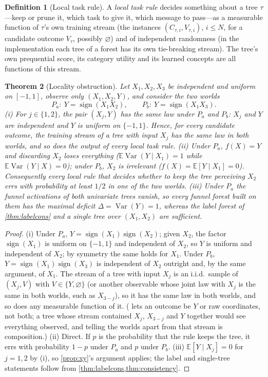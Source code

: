 \documentclass[11pt]{article}
\newtheorem{theorem}{Theorem}
\theoremstyle{definition}
\newtheorem{definition}[theorem]{Definition}
\theoremstyle{remark}
\newcommand{\E}{\mathbb{E}}
\newcommand{\Var}{\operatorname{Var}}
\begin{document}
\begin{definition}[Local task rule]\label{def:local}
A \emph{local task rule} decides something about a tree $\tau$---keep or prune it,
which task to give it, which message to pass---as a measurable function of $\tau$'s own
training stream (the instances $(C_{\tau,i},V_{\tau,i})$, $i\le N$, for a candidate
outcome $V_\tau$, possibly $\varnothing$) and of independent randomness (in the
implementation each tree of a forest has its own tie-breaking stream).  The tree's own
prequential score, its category utility and its learned concepts are all functions of
this stream.
\end{definition}

\begin{theorem}[Locality obstruction]\label{thm:locality}
Let $X_1,X_2,X_3$ be independent and uniform on $[-1,1]$, observe only $(X_1,X_2,Y)$,
and consider the two worlds
\[
  P_a:\ Y=\operatorname{sign}(X_1X_2),\qquad P_b:\ Y=\operatorname{sign}(X_1X_3).
\]
(i) For $j\in\{1,2\}$, the pair $(X_j,Y)$ has the same law under $P_a$ and $P_b$: $X_j$
and $Y$ are independent and $Y$ is uniform on $\{-1,1\}$.  Hence, for every candidate
outcome, the training stream of a tree with input $X_j$ has the same law in both worlds,
and so does the output of every local task rule.  (ii) Under $P_a$, $f(X)=Y$ and
discarding $X_2$ loses everything ($\E\Var(Y\mid X_1)=1$ while $\E\Var(Y\mid X)=0$);
under $P_b$, $X_2$ is irrelevant ($f(X)=\E[Y\mid X_1]=0$).  Consequently every local
rule that decides whether to keep the tree perceiving $X_2$ errs with probability at
least $1/2$ in one of the two worlds.  (iii) Under $P_a$ the funnel activations of both
univariate trees vanish, so every funnel forest built on them has the maximal deficit
$\Delta=\Var(Y)=1$, whereas the label forest of \cref{thm:labelcons} and a single tree
over $(X_1,X_2)$ are sufficient.
\end{theorem}
\begin{proof}
(i) Under $P_a$, $Y=\operatorname{sign}(X_1)\operatorname{sign}(X_2)$; given $X_2$, the
factor $\operatorname{sign}(X_1)$ is uniform on $\{-1,1\}$ and independent of $X_2$, so
$Y$ is uniform and independent of $X_2$; by symmetry the same holds for $X_1$.  Under
$P_b$, $Y=\operatorname{sign}(X_1)\operatorname{sign}(X_3)$ is independent of $X_2$
outright and, by the same argument, of $X_1$.  The stream of a tree with input $X_j$ is an
i.i.d.\ sample of $(X_j,V)$ with $V\in\{Y,\varnothing\}$ (or another observable whose
joint law with $X_j$ is the same in both worlds, such as $X_{3-j}$), so it has the same
law in both worlds, and so does any measurable function of it.  ( lets an
outcome be $Y$ or raw coordinates, not both; a tree whose stream contained $X_j$, $X_{3-j}$
and $Y$ together would see everything observed, and telling the worlds apart from that
stream is composition.)  (ii) Direct.  If $p$ is
the probability that the rule keeps the tree, it errs with probability $1-p$ under
$P_a$ and $p$ under $P_b$.  (iii) $\E[Y\mid X_j]=0$ for $j=1,2$ by (i), so
\cref{prop:xy}'s argument applies; the label and single-tree statements follow from
\cref{thm:labelcons,thm:consistency}.
\end{proof}
\end{document}
